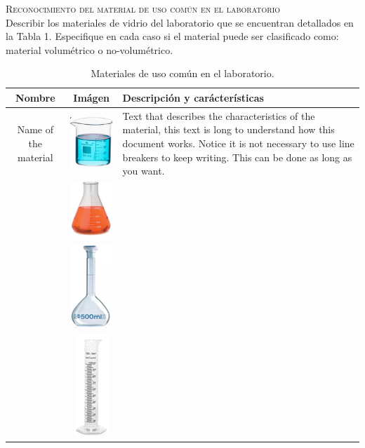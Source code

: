 \textsc{\large Reconocimiento del material de uso común en el laboratorio}\\

Describir los materiales de vidrio del laboratorio que se encuentran detallados en la Tabla 1. Especifique en cada caso si el material puede ser clasificado como: material volumétrico o no-volumétrico.

\begin{table}[ht!]
\caption{Materiales de uso común en el laboratorio.}
    \centering
    \begin{tabularx}{\linewidth}{|>{\hsize}C|>{\hsize}C|>{\hsize}L|}
    \hline
    \textbf{Nombre} & \textbf{Imágen} & \textbf{Descripción y carácterísticas}\\\hline
    Name of the material & \includegraphics[trim=0 0 0 -5, scale=0.8]{images/p1.png} & Text that describes the characteristics of the material, this text is long to understand how this document works. Notice it is not necessary to use line breakers to keep writing. This can be done as long as you want.\\\hline
     & \includegraphics[trim=0 0 0 -5, scale=0.8]{images/p2.png} & \\\hline
     & \includegraphics[trim=0 0 0 -5, scale=0.8]{images/p3.png} & \\\hline
     & \includegraphics[trim=0 0 0 -5, scale=0.8]{images/p4.png} & \\\hline

\end{tabularx}
\end{table}
